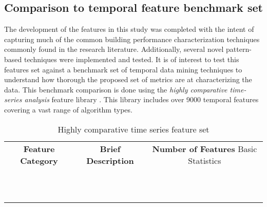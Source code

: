 \subsection{Comparison to temporal feature benchmark set}
\label{sec:hctsa_benchmark}

The development of the features in this study was completed with the intent of capturing much of the common building performance characterization techniques commonly found in the research literature. Additionally, several novel pattern-based techniques were implemented and tested. It is of interest to test this features set against a benchmark set of temporal data mining techniques to understand how thorough the proposed set of metrics are at characterizing the data. This benchmark comparison is done using the \emph{highly comparative time-series analysis} feature library \cite{Fulcher_2013}. This library includes over 9000 temporal features covering a vast range of algorithm types.


\begin{table} 
    \begin{tabular}{c c c}
        \textbf{Feature Category} & \textbf{Brief Description} & \textbf{Number of Features}
        Basic Statistics &  \\ 
         &  \\ 
         &  \\ 
         &  \\ 
         &  \\ 
         &  \\ 
         &  \\ 
         &  \\ 
         &  \\ 
         &  \\ 
         &  \\ 
         &  \\ 
    \end{tabular} 
    \caption{Highly comparative time series feature set} 
\end{table}

